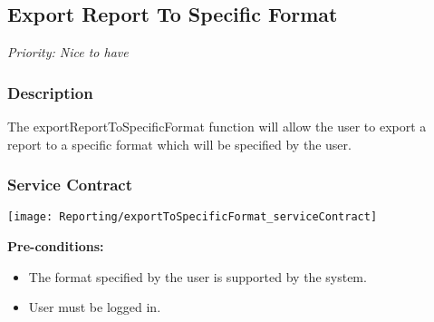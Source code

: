 \subsection{Export Report To Specific Format}
\textit{Priority: \textcolor{myGreen}{Nice to have}}

\subsubsection{Description}
The exportReportToSpecificFormat function will allow the user to export a report to a specific format which will be specified by the user.


\subsubsection{Service Contract}
\texttt{[image: Reporting/exportToSpecificFormat\_serviceContract]}

	\textbf{Pre-conditions:}
	\begin{itemize}
		\item The format specified by the user is supported by the system.
		\item User must be logged in.
	\end{itemize}
